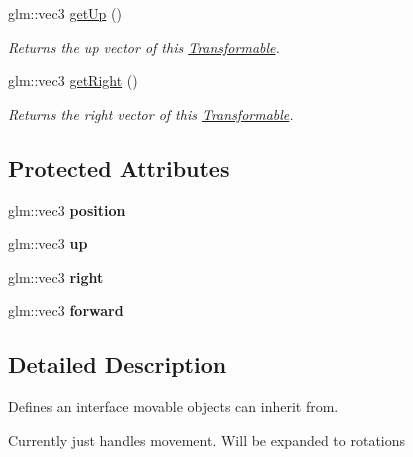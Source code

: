 \begin{DoxyCompactItemize}
glm\-::vec3 \hyperlink{class_transformable_a008dc55bda7fe6ed7020ceb9b2e887ea}{get\-Up} ()
\begin{DoxyCompactList}\small\item\em Returns the up vector of this \hyperlink{class_transformable}{Transformable}. \end{DoxyCompactList}\item 
glm\-::vec3 \hyperlink{class_transformable_ab888c267f448dab64e5fbf3438336d53}{get\-Right} ()
\begin{DoxyCompactList}\small\item\em Returns the right vector of this \hyperlink{class_transformable}{Transformable}. \end{DoxyCompactList}\end{DoxyCompactItemize}
\subsection*{Protected Attributes}
\begin{DoxyCompactItemize}
\item 
\hypertarget{class_transformable_a5328279453d732a876cd4b83b1f798c6}{glm\-::vec3 {\bfseries position}}\label{class_transformable_a5328279453d732a876cd4b83b1f798c6}

\item 
\hypertarget{class_transformable_aaa4b38b0d297c151b82ec3e232f505a3}{glm\-::vec3 {\bfseries up}}\label{class_transformable_aaa4b38b0d297c151b82ec3e232f505a3}

\item 
\hypertarget{class_transformable_a446e08f16f840276d9c9abd31ab860ac}{glm\-::vec3 {\bfseries right}}\label{class_transformable_a446e08f16f840276d9c9abd31ab860ac}

\item 
\hypertarget{class_transformable_aed738f59a4968fe33c9b62ef74d77001}{glm\-::vec3 {\bfseries forward}}\label{class_transformable_aed738f59a4968fe33c9b62ef74d77001}

\end{DoxyCompactItemize}


\subsection{Detailed Description}
Defines an interface movable objects can inherit from. 

Currently just handles movement. Will be expanded to rotations 

